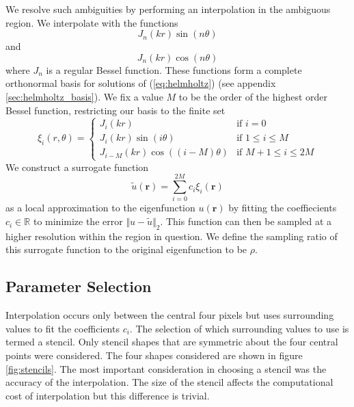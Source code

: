 \documentclass{report}
\newcommand{\rr}[0]{\mathbf{r}}
\begin{document}
We resolve such ambiguities by performing an interpolation in the ambiguous region. We interpolate with the functions
\[
J_{n}(k r) \sin(n \theta)
\]
and
\[
J_{n}(k r) \cos(n \theta)
\]
where $J_{n}$ is a regular Bessel function. These functions form a complete orthonormal basis for solutions of (\ref{eq:helmholtz}) (see appendix \ref{sec:helmholtz_basis}). We fix a value $M$ to be the order of the highest order Bessel function, restricting our basis to the finite set
\begin{equation}
  \label{eq:interp_functions}
  \xi_{i}(r, \theta)=\begin{cases}
  J_{i}(k r) & \text{if }i=0\\
  J_{i}(k r)\sin(i\theta) & \text{if }1 \le i \le M\\
  J_{i-M}(k r)\cos((i-M)\theta) & \text{if }M+1 \le i \le 2M
  \end{cases}
\end{equation}
We construct a surrogate function
\[
  \tilde{u}(\rr) = \sum_{i=0}^{2M} c_{i} \xi_{i}(\rr)
\]
as a local approximation to the eigenfunction $u(\rr)$ by fitting the coeffiecients $c_{i} \in \mathbb{R}$ to minimize the error $\Vert u - \tilde{u} \Vert_{2}$. This function can then be sampled at a higher resolution within the region in question. We define the sampling ratio of this surrogate function to the original eigenfunction to be $\rho$.

\subsection{Parameter Selection}
\label{sec:params}
Interpolation occurs only between the central four pixels but uses surrounding values to fit the coefficients $c_i$. The selection of which surrounding values to use is termed a stencil. Only stencil shapes that are symmetric about the four central points were considered. The four shapes considered are shown in figure \ref{fig:stencils}. The most important consideration in choosing a stencil was the accuracy of the interpolation. The size of the stencil affects the computational cost of interpolation but this difference is trivial.
\end{document}
